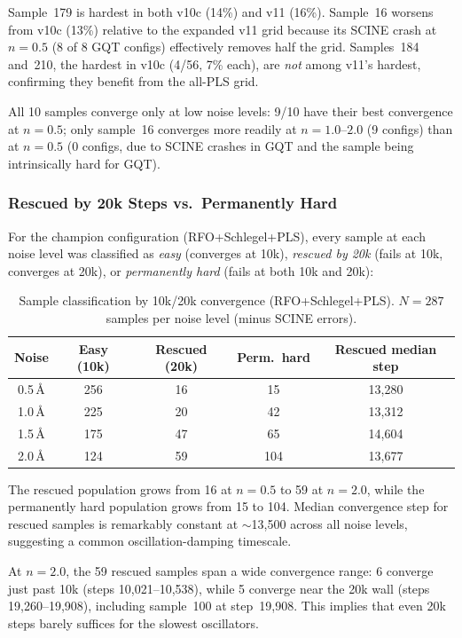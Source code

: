 \documentclass[11pt,a4paper]{article}
\theoremstyle{definition}
\begin{document}
Sample~179 is hardest in both v10c (14\%) and v11 (16\%).  Sample~16
worsens from v10c (13\%) relative to the expanded v11 grid because its
SCINE crash at $n=0.5$ (8 of 8 GQT configs) effectively removes half
the grid.  Samples~184 and~210, the hardest in v10c (4/56, 7\% each),
are \emph{not} among v11's hardest, confirming they benefit from the all-PLS grid.

All 10 samples converge only at low noise levels: 9/10 have their
best convergence at $n=0.5$; only sample~16 converges more readily
at $n=1.0$--$2.0$ (9 configs) than at $n=0.5$ (0 configs, due to SCINE
crashes in GQT and the sample being intrinsically hard for GQT).

\subsubsection{Rescued by 20k Steps vs.\ Permanently Hard}
\label{sec:rescued-vs-hard}

For the champion configuration (RFO+Schlegel+PLS), every sample at each
noise level was classified as \emph{easy} (converges at 10k), \emph{rescued
by 20k} (fails at 10k, converges at 20k), or \emph{permanently hard}
(fails at both 10k and 20k):

\begin{table}[h]
\centering
\caption{Sample classification by 10k/20k convergence (RFO+Schlegel+PLS).
  $N=287$ samples per noise level (minus SCINE errors).}
\label{tab:rescued-vs-hard}
\begin{tabular}{ccccc}
\toprule
Noise & Easy (10k) & Rescued (20k) & Perm.\ hard & Rescued median step \\
\midrule
0.5\,\AA & 256 & 16 & 15 & 13{,}280 \\
1.0\,\AA & 225 & 20 & 42 & 13{,}312 \\
1.5\,\AA & 175 & 47 & 65 & 14{,}604 \\
2.0\,\AA & 124 & 59 & 104 & 13{,}677 \\
\bottomrule
\end{tabular}
\end{table}

The rescued population grows from 16 at $n=0.5$ to 59 at $n=2.0$, while the
permanently hard population grows from 15 to 104.  Median convergence step
for rescued samples is remarkably constant at $\sim$13{,}500 across all noise
levels, suggesting a common oscillation-damping timescale.

At $n=2.0$, the 59 rescued samples span a wide convergence range:
6 converge just past 10k (steps 10{,}021--10{,}538), while 5 converge near
the 20k wall (steps 19{,}260--19{,}908), including sample~100 at step~19{,}908.
This implies that even 20k steps barely suffices for the slowest oscillators.
\end{document}
